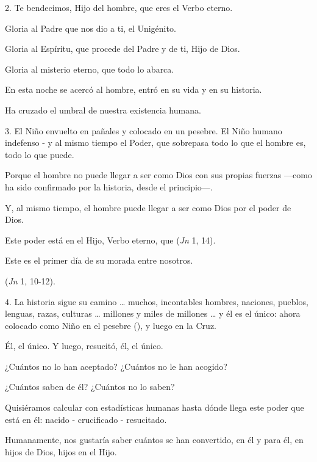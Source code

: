 \begin{body}
\begin{body}
		2. Te bendecimos, Hijo del hombre, que eres el Verbo eterno.

		Gloria al Padre que nos dio a ti, el Unigénito.

		Gloria al Espíritu, que procede del Padre y de ti, Hijo de Dios.

		Gloria al misterio eterno, que todo lo abarca.

		En esta noche se acercó al hombre, entró en su vida y en su historia.

		Ha cruzado el umbral de nuestra existencia humana.

		3. El Niño envuelto en pañales y colocado en un pesebre. El Niño humano indefenso - y al mismo tiempo el Poder, que sobrepasa todo lo que el hombre es, todo lo que puede.

		Porque el hombre no puede llegar a ser como Dios con sus propias fuerzas ---como ha sido confirmado por la historia, desde el principio---.

		Y, al mismo tiempo, el hombre puede llegar a ser como Dios por el poder de Dios.

		Este poder está en el Hijo, Verbo eterno, que  (\emph{Jn} 1, 14).

		Este es el primer día de su morada entre nosotros.

		 (\emph{Jn} 1, 10-12).

		4. La historia sigue su camino \ldots{} muchos, incontables hombres, naciones, pueblos, lenguas, razas, culturas \ldots{} millones y miles de millones \ldots{} y él es el único: ahora colocado como Niño en el pesebre (), y luego en la Cruz.

		Él, el único. Y luego, resucitó, él, el único.

		¿Cuántos no lo han aceptado? ¿Cuántos no le han acogido?

		¿Cuántos saben de él? ¿Cuántos no lo saben?

		Quisiéramos calcular con estadísticas humanas hasta dónde llega este poder que está en él: nacido - crucificado - resucitado.

		Humanamente, nos gustaría saber cuántos se han convertido, en él y para él, en hijos de Dios, hijos en el Hijo.


\end{body}
\end{body}
